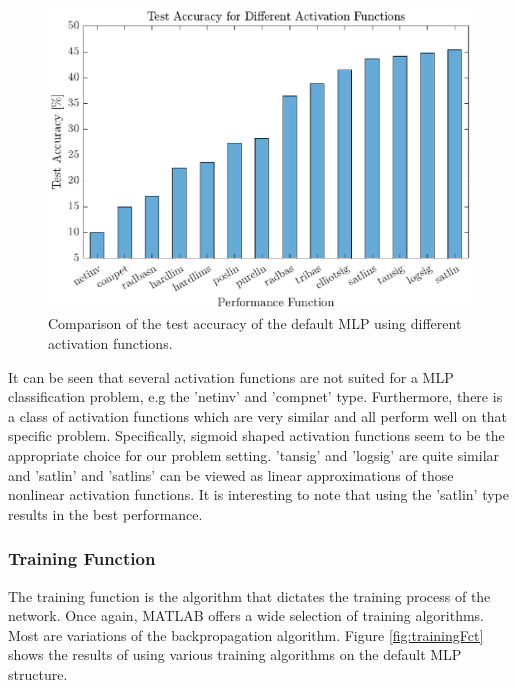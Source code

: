  \begin{figure}[h!]
 	\centering
 	\includegraphics{images/activationFct}
 	\caption{Comparison of the test accuracy of the default MLP using different activation functions.}
 	\label{fig:activationFct}
 \end{figure}

 It can be seen that several activation functions are not suited for a MLP classification problem, e.g the 'netinv' and 'compnet' type. Furthermore, there is a class of activation functions which are very similar and all perform well on that specific problem. Specifically, sigmoid shaped activation functions seem to be the appropriate choice for our problem setting. 'tansig' and 'logsig' are quite similar and 'satlin' and 'satlins' can be viewed as linear approximations of those nonlinear activation functions. It is interesting to note that using the 'satlin' type results in the best performance.

\subsubsection{Training Function}

 The training function is the algorithm that dictates the training process of the network. Once again, MATLAB offers a wide selection of training algorithms. Most are variations of the backpropagation algorithm. Figure \ref{fig:trainingFct} shows the results of using various training algorithms on the default MLP structure.

